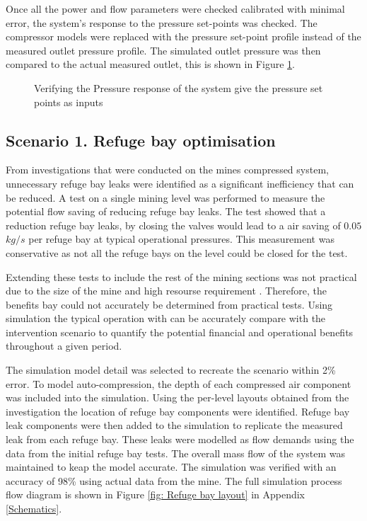 	Once all the power and flow parameters were checked calibrated with minimal error, the system's response to the pressure set-points was checked. The compressor models were replaced with the pressure set-point profile instead of the measured outlet pressure profile. The simulated outlet pressure was then compared to the actual measured outlet, this is shown in Figure \ref{fig: Verification Pressure kusasalethu Setpoint}.

	\begin{figure}[h]
		\centering
		
		\caption{Verifying the Pressure response of the system give the pressure set points as inputs}
		\label{fig: Verification Pressure kusasalethu Setpoint}
	\end{figure}
	\subsection{Scenario 1. Refuge bay optimisation}
	From investigations that were conducted on the mines compressed system, unnecessary refuge bay leaks were identified as a significant inefficiency that can be reduced. A test on a single mining level was performed to  measure the potential flow saving of reducing refuge bay leaks. The test showed that a reduction refuge bay leaks, by closing the valves would lead to a air saving of $0.05$ $kg/s$ per refuge bay at typical operational pressures. This measurement was conservative as not all the refuge bays on the level could be closed for the test. 
	\par 
	Extending these tests to include the rest of the mining sections was not practical due to the size of the mine and high resourse requirement . Therefore, the benefits bay could not accurately be determined from practical tests. Using simulation the typical operation with can be accurately compare with the intervention scenario to quantify the potential financial and operational benefits throughout a given period.
	\par
	The simulation model detail was selected to recreate the scenario within 2\% error. To model auto-compression, the depth of each compressed air component was included into the simulation. Using the per-level layouts obtained from the investigation the location of refuge bay components were identified. Refuge bay leak components were then added to the simulation to replicate the measured leak from each refuge bay. These leaks were modelled as flow demands using the data from the initial refuge bay tests. The overall mass flow of the system was maintained to keap the model accurate. The simulation was verified with an accuracy of 98\% using actual data from the mine. The full simulation process flow diagram is shown in Figure \ref{fig: Refuge bay layout} in Appendix \ref{Schematics}.
	\par 
	
